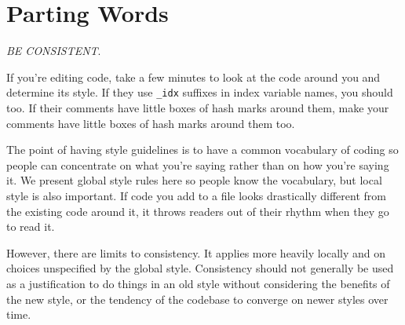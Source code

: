 \documentclass[
]{article}
\begin{document}
\section{Parting Words}
\emph{BE CONSISTENT}.

If you're editing code, take a few minutes to look at the code around
you and determine its style. If they use \texttt{\_idx} suffixes in
index variable names, you should too. If their comments have little
boxes of hash marks around them, make your comments have little boxes of
hash marks around them too.

The point of having style guidelines is to have a common vocabulary of
coding so people can concentrate on what you're saying rather than on
how you're saying it. We present global style rules here so people know
the vocabulary, but local style is also important. If code you add to a
file looks drastically different from the existing code around it, it
throws readers out of their rhythm when they go to read it.

However, there are limits to consistency. It applies more heavily
locally and on choices unspecified by the global style. Consistency
should not generally be used as a justification to do things in an old
style without considering the benefits of the new style, or the tendency
of the codebase to converge on newer styles over time.
\end{document}
